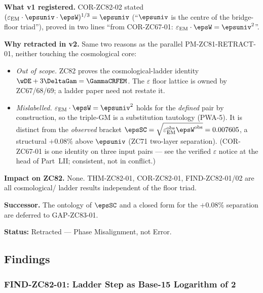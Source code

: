 \documentclass[12pt, a4paper]{article}
\renewcommand{\epsEM}{\varepsilon_{\rm EM}}
\begin{document}
\begin{openqbox}[title={PM-ZC82-RETRACT-02: COR-ZC82-02 Retracted
  --- Out of Scope and Mislabelled}]

\textbf{What v1 registered.}
COR-ZC82-02 stated $(\epsEM\cdot\epsuniv\cdot\epsW)^{1/3}=\epsuniv$
(``$\epsuniv$ is the centre of the bridge-floor triad''), proved in
two lines ``from COR-ZC67-01: $\epsEM\cdot\epsW=\epsuniv^2$''.

\textbf{Why retracted in v2.}
Same two reasons as the parallel PM-ZC81-RETRACT-01, neither touching
the cosmological core:
\begin{itemize}[leftmargin=2em, noitemsep]
  \item \textit{Out of scope.} ZC82 proves the cosmological-ladder
    identity $\wDE+3\DeltaGam=\GammaCRFEM$. The $\varepsilon$ floor
    lattice is owned by ZC67/68/69; a ladder paper need not restate it.
  \item \textit{Mislabelled.} $\epsEM\cdot\epsW=\epsuniv^2$ holds for
    the \emph{defined} pair by construction, so the triple-GM is a
    substitution tautology (PWA-5). It is distinct from the
    \emph{observed} bracket
    $\epsSC=\sqrt{\epsEM^{\rm obs}\epsW^{\rm obs}}=0.007605$, a
    structural $+0.08\%$ above $\epsuniv$ (ZC71 two-layer separation).
    (COR-ZC67-01 is one identity on three input pairs --- see the
    verified $\varepsilon$ notice at the head of Part~LII; consistent,
    not in conflict.)
\end{itemize}

\textbf{Impact on ZC82.}
None. THM-ZC82-01, COR-ZC82-01, FIND-ZC82-01/02 are all cosmological/
ladder results independent of the floor triad.

\textbf{Successor.} The ontology of $\epsSC$ and a closed form for the
$+0.08\%$ separation are deferred to GAP-ZC83-01.

\textbf{Status:} Retracted --- Phase Misalignment, not Error.
\end{openqbox}

\subsection{Findings}
\label{sec:finds}

\subsubsection{FIND-ZC82-01: Ladder Step as Base-15 Logarithm of 2}
\label{sec:find01}
\end{document}
